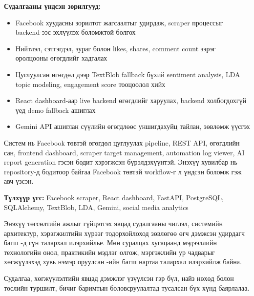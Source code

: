 \documentclass[
12pt,
oneside,
english,
onehalfspacing,
nolistspacing,
headsepline,
]{MUST-Thesis}
\newcommand{\acknowledgementname}{Талархал}
\begin{document}
\textbf{Судалгааны үндсэн зорилгууд:}
\begin{itemize}
    \item Facebook хуудасны зорилтот жагсаалтыг удирдаж, scraper процессыг backend-ээс эхлүүлэх боломжтой болгох
    \item Нийтлэл, сэтгэгдэл, зураг болон likes, shares, comment count зэрэг оролцооны өгөгдлийг хадгалах
    \item Цуглуулсан өгөгдөл дээр TextBlob fallback бүхий sentiment analysis, LDA topic modeling, engagement score тооцоолол хийх
    \item React dashboard-аар live backend өгөгдлийг харуулах, backend холбогдохгүй үед demo fallback ашиглах
    \item Gemini API ашиглан сүүлийн өгөгдлөөс уншигдахуйц тайлан, зөвлөмж үүсгэх
\end{itemize}

Систем нь Facebook төвтэй өгөгдөл цуглуулах pipeline, REST API, өгөгдлийн сан, frontend dashboard, scraper target management, automation log viewer, AI report generation гэсэн бодит хэрэгжсэн бүрэлдэхүүнтэй. Энэхүү хувилбар нь repository-д бодитоор байгаа Facebook төвтэй workflow-г л үндсэн боломж гэж авч үзсэн.

\textbf{Түлхүүр үгс:} Facebook scraper, React dashboard, FastAPI, PostgreSQL, SQLAlchemy, TextBlob, LDA, Gemini, social media analytics

\begin{acknowledgements}
\addchaptertocentry{\acknowledgementname}

Энэхүү төгсөлтийн ажлыг гүйцэтгэх явцад судалгааны чиглэл, системийн архитектур, хэрэгжилтийн хүрээг тодорхойлоход зөвлөгөө өгч дэмжсэн удирдагч багш \supname-д гүн талархал илэрхийлье. Мөн суралцах хугацаанд мэдээллийн технологийн онол, практикийн мэдлэг олгож, мэргэжлийн ур чадварыг хөгжүүлэхэд хувь нэмэр оруулсан \facname-ийн багш нартаа талархал илэрхийлж байна.

Судалгаа, хөгжүүлэлтийн явцад дэмжлэг үзүүлсэн гэр бүл, найз нөхөд болон төслийн туршилт, бичиг баримтын боловсруулалтад тусалсан бүх хүнд баярлалаа.

\end{acknowledgements}
\end{document}
